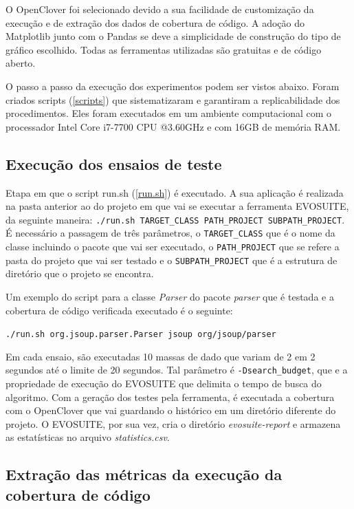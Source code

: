 O OpenClover foi selecionado devido a sua facilidade de customização da execução e de extração dos dados de cobertura de código. A adoção do Matplotlib junto com o Pandas se deve a simplicidade de construção do tipo de gráfico escolhido. Todas as ferramentas utilizadas são gratuitas e de código aberto.

O passo a passo da execução dos experimentos podem ser vistos abaixo. Foram criados scripts (\ref{scripts}) que sistematizaram e garantiram a replicabilidade dos procedimentos. Eles foram executados em um ambiente computacional com o processador Intel Core i7-7700 CPU @3.60GHz e com 16GB de memória RAM.

\subsection{Execução dos ensaios de teste}

Etapa em que o script run.sh (\ref{run.sh}) é executado. A sua aplicação é realizada na pasta anterior ao do projeto em que vai se executar a ferramenta EVOSUITE, da seguinte maneira: \texttt{./run.sh TARGET_CLASS PATH_PROJECT SUBPATH_PROJECT}. É necessário a passagem de três parâmetros, o \texttt{TARGET_CLASS} que é o nome da classe incluindo o pacote que vai ser executado, o \texttt{PATH_PROJECT} que se refere a pasta do projeto que vai ser testado e o \texttt{SUBPATH_PROJECT} que é a estrutura de diretório que o projeto se encontra. 

Um exemplo do script para a classe \textit{Parser} do pacote \textit{parser} que é testada e a cobertura de código verificada executado é o seguinte: 

\texttt{./run.sh org.jsoup.parser.Parser jsoup org/jsoup/parser}

Em cada ensaio, são executadas 10 massas de dado que variam de 2 em 2 segundos até o limite de 20 segundos. Tal parâmetro é \texttt{-Dsearch_budget}, que e a propriedade de execução do EVOSUITE que delimita o tempo de busca do algoritmo. Com a geração dos testes pela ferramenta, é executada a cobertura com o OpenClover que vai guardando o histórico em um diretório diferente do projeto. O EVOSUITE, por sua vez, cria o diretório \textit{evosuite-report} e armazena as estatísticas no arquivo \textit{statistics.csv}.

\subsection{Extração das métricas da execução da cobertura de código}

